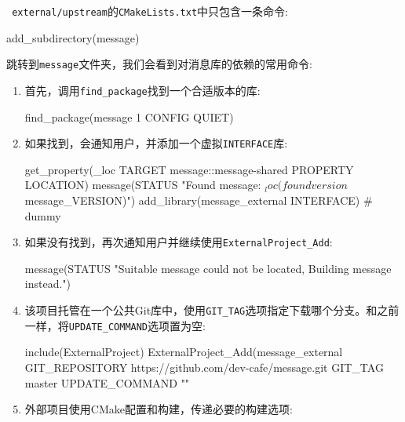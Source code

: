 \texttt{ external/upstream}的\texttt{CMakeLists.txt}中只包含一条命令:

\begin{codebox}[cmake]
add_subdirectory(message)
\end{codebox}

跳转到\texttt{message}文件夹，我们会看到对消息库的依赖的常用命令:

\begin{enumerate}
\item 首先，调用\texttt{find\_package}找到一个合适版本的库:

\begin{codebox}[cmake]
find_package(message 1 CONFIG QUIET)
\end{codebox}

\item 如果找到，会通知用户，并添加一个虚拟\texttt{INTERFACE}库:

\begin{codebox}[cmake]
get_property(_loc TARGET message::message-shared PROPERTY LOCATION)
message(STATUS "Found message: ${_loc} (found version ${message_VERSION})")
add_library(message_external INTERFACE) # dummy
\end{codebox}

\item 如果没有找到，再次通知用户并继续使用\texttt{ExternalProject\_Add}:

\begin{codebox}[cmake]
message(STATUS "Suitable message could not be located, Building message instead.")
\end{codebox}

\item 该项目托管在一个公共Git库中，使用\texttt{GIT\_TAG}选项指定下载哪个分支。和之前一样，将\texttt{UPDATE\_COMMAND}选项置为空:

\begin{codebox}[cmake]
include(ExternalProject)
ExternalProject_Add(message_external
  GIT_REPOSITORY
    https://github.com/dev-cafe/message.git
  GIT_TAG
    master
  UPDATE_COMMAND
    ""
\end{codebox}

\item 外部项目使用CMake配置和构建，传递必要的构建选项:



\end{enumerate}
